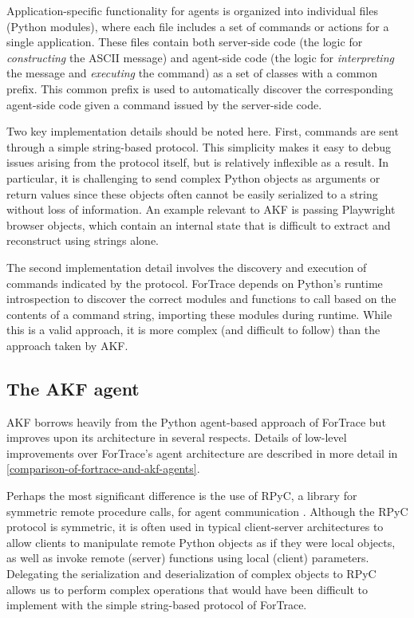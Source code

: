 \documentclass[letterpaper,12pt]{report}
\begin{document}
Application-specific functionality for agents is organized into
individual files (Python modules), where each file includes a set of
commands or actions for a single application. These files contain both
server-side code (the logic for \emph{constructing} the ASCII message)
and agent-side code (the logic for \emph{interpreting} the message and
\emph{executing} the command) as a set of classes with a common prefix.
This common prefix is used to automatically discover the corresponding
agent-side code given a command issued by the server-side code.

Two key implementation details should be noted here. First, commands are
sent through a simple string-based protocol. This simplicity makes it
easy to debug issues arising from the protocol itself, but is relatively
inflexible as a result. In particular, it is challenging to send complex
Python objects as arguments or return values since these objects often
cannot be easily serialized to a string without loss of information. An
example relevant to AKF is passing Playwright browser objects, which
contain an internal state that is difficult to extract and reconstruct
using strings alone.

The second implementation detail involves the discovery and execution of
commands indicated by the protocol. ForTrace depends on Python's runtime
introspection to discover the correct modules and functions to call
based on the contents of a command string, importing these modules
during runtime. While this is a valid approach, it is more complex (and
difficult to follow) than the approach taken by AKF.

\subsection{The AKF agent}\label{the-akf-agent}

AKF borrows heavily from the Python agent-based approach of ForTrace but
improves upon its architecture in several respects. Details of low-level
improvements over ForTrace's agent architecture are described in more
detail in \autoref{comparison-of-fortrace-and-akf-agents}.

Perhaps the most significant difference is the use of RPyC, a library
for symmetric remote procedure calls, for agent communication
\cite{TomerfilibaorgRpyc2025}. Although the RPyC protocol is
symmetric, it is often used in typical client-server architectures to
allow clients to manipulate remote Python objects as if they were local
objects, as well as invoke remote (server) functions using local
(client) parameters. Delegating the serialization and deserialization of
complex objects to RPyC allows us to perform complex operations that
would have been difficult to implement with the simple string-based
protocol of ForTrace.
\end{document}
